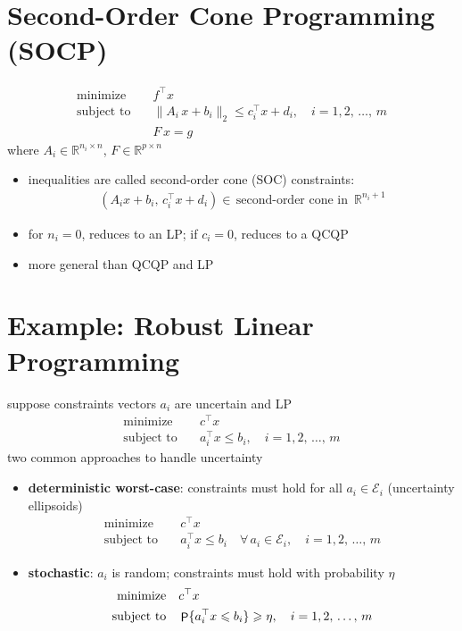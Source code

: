 \documentclass[11pt]{extarticle}
\newcommand{\ds}{\displaystyle}
\DeclareMathOperator\prb{{\sf P}}
\theoremstyle{definition}
\begin{document}
\newpage

\section*{Second-Order Cone Programming (SOCP)}
\begin{align*}
  \text{minimize}\quad & f^\top x \\
  \text{subject to}\quad & \|A_i\,x + b_i\|_2 \leqslant c^\top_i x + d_i, \quad i = 1, 2,\,\ldots,\,m \\
  \qquad\qquad &F\,x = g
\end{align*}
where $A_i\in\mathbb{R}^{n_i\times n}$, $F\in\mathbb{R}^{p\times n}$
\begin{itemize}
  \item inequalities are called second-order cone (SOC) constraints:
    \begin{align*}
      (A_i x + b_i,\,c^\top_i x + d_i)\in\,\text{second-order cone in }\,\mathbb{R}^{n_i + 1}
    \end{align*}
  \item for $n_i = 0$, reduces to an LP; if $c_i = 0$, reduces to a QCQP 
  \item more general than QCQP and LP
\end{itemize}

\newpage

\section*{Example: Robust Linear Programming}

suppose constraints vectors $a_i$ are uncertain and LP
\begin{align*}
  \text{minimize}\quad & c^\top x \\
  \text{subject to}\quad & a_i^\top x \leqslant b_i, \quad i = 1, 2,\,\ldots,\,m 
\end{align*}
two common approaches to handle uncertainty
\begin{itemize}
  \item {\bf deterministic worst-case}: constraints must hold for all $\ds a_i\in\mathcal{E}_i$ (uncertainty ellipsoids) 
    \begin{align*}
      \text{minimize}\quad & c^\top x \\
      \text{subject to}\quad & a_i^\top x \leqslant b_i\quad\forall\,a_i\in\mathcal{E}_i, \quad i = 1, 2,\,\ldots,\,m 
    \end{align*}
  \item {\bf stochastic}: $a_i$ is random; constraints must hold with probability $\eta$ 
    \begin{align*}
      \text{minimize}\quad & c^\top x \\
      \text{subject to}\quad & \prb\{a_i^\top x\leqslant b_i\}\geqslant\eta, \quad i = 1, 2,\,\ldots,\,m 
    \end{align*}
\end{itemize}
\end{document}
